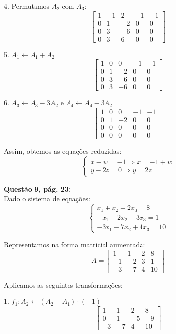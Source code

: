 \documentclass[a4paper,12pt]{article}
\begin{document}
4. Permutamos \( A_2 \) com \( A_3 \):
\[
\begin{bmatrix}
1 & -1 & 2 & -1 & -1 \\
0 & 1 & -2 & 0 & 0 \\
0 & 3 & -6 & 0 & 0 \\
0 & 3 & 6 & 0 & 0
\end{bmatrix}
\]

5. \( A_1 \leftarrow A_1 + A_2 \)
\[
\begin{bmatrix}
1 & 0 & 0 & -1 & -1 \\
0 & 1 & -2 & 0 & 0 \\
0 & 3 & -6 & 0 & 0 \\
0 & 3 & -6 & 0 & 0
\end{bmatrix}
\]

6. \( A_3 \leftarrow A_3 - 3A_2 \) e \( A_4 \leftarrow A_4 - 3A_2 \)
\[
\begin{bmatrix}
1 & 0 & 0 & -1 & -1 \\
0 & 1 & -2 & 0 & 0 \\
0 & 0 & 0 & 0 & 0 \\
0 & 0 & 0 & 0 & 0
\end{bmatrix}
\]

Assim, obtemos as equações reduzidas:
\[
\begin{cases}
x - w = -1 \Rightarrow x = -1 + w \\
y - 2z = 0 \Rightarrow y = 2z
\end{cases}
\]



\textbf{Questão 9, pág. 23:}\\

Dado o sistema de equações:
\[
\begin{cases}
x_1 + x_2 + 2x_3 = 8 \\
- x_1 - 2x_2 + 3x_3 = 1 \\
-3x_1 - 7x_2 + 4x_3 = 10
\end{cases}
\]

Representamos na forma matricial aumentada:
\[
A =
\begin{bmatrix}
1 & 1 & 2 & 8 \\
-1 & -2 & 3 & 1 \\
-3 & -7 & 4 & 10
\end{bmatrix}
\]

Aplicamos as seguintes transformações:

1. \( f_1: A_2 \leftarrow (A_2 - A_1) \cdot (-1) \)
\[
\begin{bmatrix}
1 & 1 & 2 & 8 \\
0 & 1 & -5 & -9 \\
-3 & -7 & 4 & 10
\end{bmatrix}
\]
\end{document}
